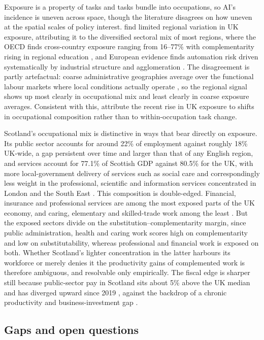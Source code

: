 Exposure is a property of tasks and tasks bundle into occupations, so AI's incidence is uneven across space, though the literature disagrees on how uneven at the spatial scales of policy interest. \citet{tbi2024} find limited regional variation in UK exposure, attributing it to the diversified sectoral mix of most regions, where the OECD finds cross-country exposure ranging from 16--77\% with complementarity rising in regional education \citep{oecd2024}, and European evidence finds automation risk driven systematically by industrial structure and agglomeration \citep{crowley2021}. The disagreement is partly artefactual: coarse administrative geographies average over the functional labour markets where local conditions actually operate \citep{overman2022}, so the regional signal shows up most clearly in occupational mix and least clearly in coarse exposure averages. Consistent with this, \citet{henseke2025} attribute the recent rise in UK exposure to shifts in occupational composition rather than to within-occupation task change.

Scotland's occupational mix is distinctive in ways that bear directly on exposure. Its public sector accounts for around 22\% of employment against roughly 18\% UK-wide, a gap persistent over time and larger than that of any English region, and services account for 77.1\% of Scottish GDP against 80.5\% for the UK, with more local-government delivery of services such as social care and correspondingly less weight in the professional, scientific and information services concentrated in London and the South East \citep{scotgov2024, commonslibrary2024}. This composition is double-edged. Financial, insurance and professional services are among the most exposed parts of the UK economy, and caring, elementary and skilled-trade work among the least \citep{obr2025}. But the exposed sectors divide on the substitution--complementarity margin, since public administration, health and caring work scores high on complementarity and low on substitutability, whereas professional and financial work is exposed on both. Whether Scotland's lighter concentration in the latter harbours its workforce or merely denies it the productivity gains of complemented work is therefore ambiguous, and resolvable only empirically. The fiscal edge is sharper still because public-sector pay in Scotland sits about 5\% above the UK median and has diverged upward since 2019 \citep{cribb2025}, against the backdrop of a chronic productivity and business-investment gap \citep{williams2025}.

\subsection*{Gaps and open questions}


